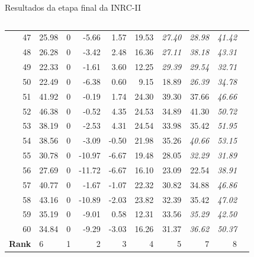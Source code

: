 \documentclass[8pt,mathserif,professionalfont]{beamer}
\begin{document}
\begin{frame}{Resultados da etapa final da INRC-II}
\begin{columns}
\begin{column}{0.5\textwidth}
\begin{table}[!]
{\begin{tabular}{rlrrrrrrrr}
   47 &  25.98 &   0 & -5.66 & 1.57 & 19.53 & \it 27.40 & \it 28.98 & \it 41.42 \\
   48 &  26.28 &   0 & -3.42 & 2.48 & 16.36 & \it 27.11 & \it 38.18 & \it 43.31 \\
   49 &  22.33 &   0 & -1.61 & 3.60 & 12.25 & \it 29.39 & \it 29.54 & \it 32.71 \\
   50 &  22.49 &   0 & -6.38 & 0.60 & 9.15 & 18.89 & \it 26.39 & \it 34.78 \\
   51 & 41.92 &   0 & -0.19 & 1.74 & 24.30 & 39.30 & 37.66 & \it 46.66 \\
   52 & 46.38 &   0 & -0.52 & 4.35 & 24.53 & 34.89 & 41.30 & \it 50.72 \\
   53 & 38.19 &   0 & -2.53 & 4.31 & 24.54 & 33.98 & 35.42 & \it 51.95 \\
   54 & 38.56 &   0 & -3.09 & -0.50 & 21.98 & 35.26 & \it 40.66 & \it 53.15 \\
   55 & 30.78 &   0 & -10.97 & -6.67 & 19.48 & 28.05 & \it 32.29 & \it 31.89 \\
   56 & 27.69 &   0 & -11.72 & -6.67 & 16.10 & 23.09 & 22.54 & \it 38.91 \\
   57 & 40.77 &   0 & -1.67 & -1.07 & 22.32 & 30.82 & 34.88 & \it 46.86 \\
   58 & 43.16 &   0 & -10.89 & -2.03 & 23.82 & 32.39 & 35.42 & \it 47.02 \\
   59 & 35.19 &   0 & -9.01 & 0.58 & 12.31 & 33.56 & \it 35.29 & \it 42.50 \\
   60 & 34.84 &   0 & -9.29 & -3.03 & 16.26 & 31.37 & \it 36.62 & \it 50.37 \\
 \midrule
  \textbf{Rank} & 6 & 1 & 2 & 3 & 4 & 5 & 7 & 8 \\
   \bottomrule
\end{tabular}
}
\end{table}

\end{column}
\end{columns}





\end{frame}
\end{document}
